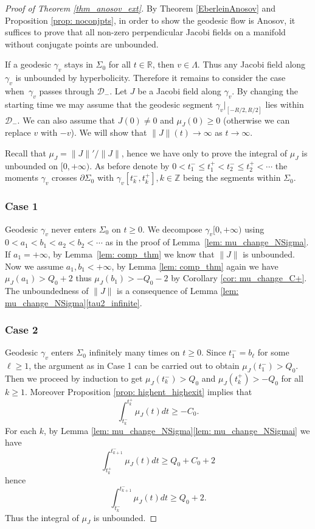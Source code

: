 \documentclass[10pt]{amsart}
\theoremstyle{definition}
\renewcommand{\>}{{\rangle}}
\newcommand{\<}{{\langle}}
\begin{document}
\begin{proof}[Proof of Theorem \ref{thm_anosov_ext}]

By Theorem \ref{EberleinAnosov} and Proposition \ref{prop: noconjpts}, in order to show the geodesic flow is Anosov, it suffices to prove that all non-zero perpendicular Jacobi fields on a manifold without conjugate points are unbounded.

If a geodesic $\gamma_v$ stays in $\Sigma_0$ for all $t\in\mathbb{R}$, then $v\in\Lambda$. Thus any Jacobi field along~$\gamma_v$ is unbounded by hyperbolicity. Therefore it remains to consider the case when~$\gamma_v$ passes through $\mathcal{D}_-$. Let $J$ be a Jacobi field along $\gamma_v$. By changing the starting time we may assume that the geodesic segment $\gamma_v|_{[-R/2,R/2]}$ lies within $\mathcal{D}_-$. We can also assume that $J(0)\neq 0$ and $\mu_J(0)\geq 0$ (otherwise we can replace $v$ with $-v$). We will show that $\|J\|(t)\to\infty$ as $t\to\infty$.

Recall that $\mu_J=\|J\|'/\|J\|$, hence we have only to prove the integral of $\mu_J$ is unbounded on $[0,+\infty)$.
As before denote by $0<t^-_1\leq t^+_1<t^-_2\leq t^+_2<\cdots$ the moments $\gamma_v$ crosses $\partial\Sigma_0$ with $\gamma_v[t^-_k, t^+_k], k\in\mathbb{Z}$ being the segments within $\Sigma_0$.

\subsubsection*{Case 1} Geodesic $\gamma_v$ never enters $\Sigma_0$ on $t\geq 0$. We decompose $\gamma_v[0,+\infty)$ using $0<a_1<b_1<a_2<b_2<\cdots$ as in the proof of Lemma~\ref{lem: mu_change_NSigma}. If $a_1=+\infty$, by Lemma~\ref{lem: comp_thm} we know that $\|J\|$ is unbounded. Now we assume $a_1,b_1<+\infty$, by Lemma \ref{lem: comp_thm} again we have $\mu_J(a_1)>Q_0+2$ thus $\mu_J(b_1)>-Q_0-2$ by Corollary \ref{cor: mu_change_C+}. The unboundedness of $\|J\|$ is a consequence of Lemma \ref{lem: mu_change_NSigma}\eqref{tau2_infinite}.

\subsubsection*{Case 2} Geodesic $\gamma_v$ enters $\Sigma_0$ infinitely many times on $t\geq 0$. Since $t^-_1=b_\ell$ for some $\ell\geq 1$, the argument as in Case 1 can be carried out to obtain $\mu_J(t^-_1)>Q_0$. Then we proceed by induction to get $\mu_J(t^-_k)>Q_0$ and $\mu_J(t^+_k)>-Q_0$ for all $k\geq 1$. Moreover Proposition \ref{prop: highent_highexit} implies that
\[
\int_{t^-_k}^{t^+_k}\mu_J(t)dt\geq -C_0.
\]
For each $k$, by Lemma \ref{lem: mu_change_NSigma}\eqref{lem: mu_change_NSigmai} we have
\[
\int_{t^+_k}^{t^-_{k+1}}\mu_J(t)dt\geq Q_0+C_0+2
\]
hence
\[
\int_{t^-_k}^{t^-_{k+1}}\mu_J(t)dt\geq Q_0+2.
\] Thus the integral of $\mu_J$ is unbounded.


\end{proof}
\end{document}
